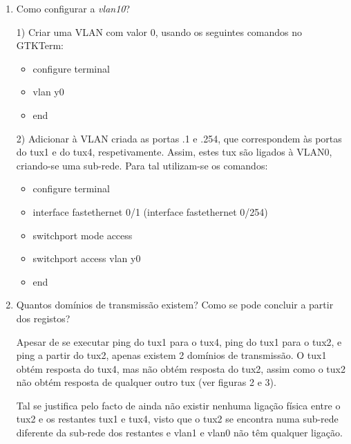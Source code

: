 \documentclass{article}
\begin{document}
\begin{enumerate}
\item Como configurar a \textit{vlan10}?

1) Criar uma VLAN com valor 0, usando os seguintes comandos no GTKTerm:
\begin{itemize}
    \item configure terminal
    \item vlan y0
    \item end
\end{itemize}
2) Adicionar à VLAN criada as portas .1 e .254, que correspondem às portas do tux1 e do tux4, respetivamente. Assim, estes tux são ligados à VLAN0, criando-se uma sub-rede. Para tal utilizam-se os comandos:
\begin{itemize}
    \item configure terminal
    \item interface fastethernet 0/1  (interface fastethernet 0/254)
    \item switchport mode access
    \item switchport access vlan y0
    \item end
\end{itemize}

\item Quantos domínios de transmissão existem? Como se pode concluir a partir dos registos?

Apesar de se executar ping do tux1 para o tux4, ping do tux1 para o tux2, e ping a partir do tux2, apenas existem 2 domínios de transmissão.  O tux1 obtém resposta do tux4, mas não obtém resposta do tux2, assim como o tux2 não obtém resposta de qualquer outro tux (ver figuras 2 e 3). 

Tal se justifica pelo facto de ainda não existir nenhuma ligação física entre o tux2 e os restantes tux1 e tux4, visto que o tux2 se encontra numa sub-rede diferente da sub-rede dos restantes e vlan1 e vlan0 não têm qualquer ligação.

\end{enumerate}
\end{document}
